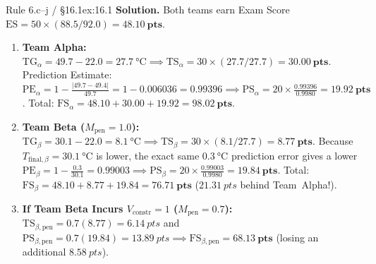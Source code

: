 \begin{workedexample}{Rule 6.c--j / §16.1}{ex:16.1}
\textbf{Solution.} Both teams earn Exam Score $\mathrm{ES} = 50 \times (88.5 / 92.0) = \mathbf{\SI{48.10}{pts}}$.
\begin{enumerate}
  \item \textbf{Team Alpha:} $\mathrm{TG}_\alpha = 49.7 - 22.0 = \SI{27.7}{\celsius} \implies \mathrm{TS}_\alpha = 30 \times (27.7 / 27.7) = \mathbf{\SI{30.00}{pts}}$. Prediction Estimate: $\mathrm{PE}_\alpha = 1 - \frac{|49.7 - 49.4|}{49.7} = 1 - 0.006036 = \mathbf{0.99396} \implies \mathrm{PS}_\alpha = 20 \times \frac{0.99396}{0.9980} = \mathbf{\SI{19.92}{pts}}$. Total: $\mathrm{FS}_\alpha = 48.10 + 30.00 + 19.92 = \mathbf{\SI{98.02}{pts}}$.
  \item \textbf{Team Beta ($M_{\mathrm{pen}} = 1.0$):} $\mathrm{TG}_\beta = 30.1 - 22.0 = \SI{8.1}{\celsius} \implies \mathrm{TS}_\beta = 30 \times (8.1 / 27.7) = \mathbf{\SI{8.77}{pts}}$. Because $T_{\mathrm{final},\beta} = \SI{30.1}{\celsius}$ is lower, the exact same $\SI{0.3}{\celsius}$ prediction error gives a lower $\mathrm{PE}_\beta = 1 - \frac{0.3}{30.1} = \mathbf{0.99003} \implies \mathrm{PS}_\beta = 20 \times \frac{0.99003}{0.9980} = \mathbf{\SI{19.84}{pts}}$. Total: $\mathrm{FS}_\beta = 48.10 + 8.77 + 19.84 = \mathbf{\SI{76.71}{pts}}$ ($\SI{21.31}{pts}$ behind Team~Alpha!).
  \item \textbf{If Team Beta Incurs $V_{\mathrm{constr}} = 1$ ($M_{\mathrm{pen}} = 0.7$):} $\mathrm{TS}_{\beta,\mathrm{pen}} = 0.7(8.77) = \SI{6.14}{pts}$ and $\mathrm{PS}_{\beta,\mathrm{pen}} = 0.7(19.84) = \SI{13.89}{pts} \implies \mathrm{FS}_{\beta,\mathrm{pen}} = \mathbf{\SI{68.13}{pts}}$ (losing an additional $\SI{8.58}{pts}$).
\end{enumerate}
\end{workedexample}

